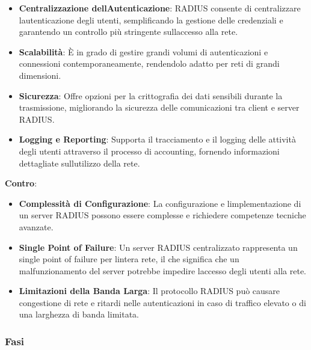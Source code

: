 \begin{itemize}
\item
  \textbf{Centralizzazione dell\textquotesingle Autenticazione}: RADIUS
  consente di centralizzare l\textquotesingle autenticazione degli
  utenti, semplificando la gestione delle credenziali e garantendo un
  controllo più stringente sull\textquotesingle accesso alla rete.
\item
  \textbf{Scalabilità}: È in grado di gestire grandi volumi di
  autenticazioni e connessioni contemporaneamente, rendendolo adatto per
  reti di grandi dimensioni.
\item
  \textbf{Sicurezza}: Offre opzioni per la crittografia dei dati
  sensibili durante la trasmissione, migliorando la sicurezza delle
  comunicazioni tra client e server RADIUS.
\item
  \textbf{Logging e Reporting}: Supporta il tracciamento e il logging
  delle attività degli utenti attraverso il processo di accounting,
  fornendo informazioni dettagliate sull\textquotesingle utilizzo della
  rete.
\end{itemize}

\textbf{Contro}:

\begin{itemize}
\item
  \textbf{Complessità di Configurazione}: La configurazione e
  l\textquotesingle implementazione di un server RADIUS possono essere
  complesse e richiedere competenze tecniche avanzate.
\item
  \textbf{Single Point of Failure}: Un server RADIUS centralizzato
  rappresenta un single point of failure per l\textquotesingle intera
  rete, il che significa che un malfunzionamento del server potrebbe
  impedire l\textquotesingle accesso degli utenti alla rete.
\item
  \textbf{Limitazioni della Banda Larga}: Il protocollo RADIUS può
  causare congestione di rete e ritardi nelle autenticazioni in caso di
  traffico elevato o di una larghezza di banda limitata.
\end{itemize}

\subsubsection{Fasi}\label{fasi-3}

